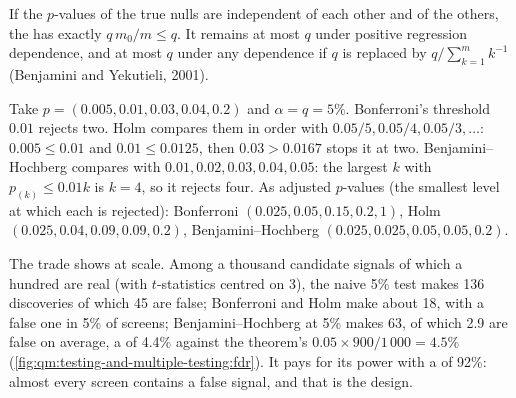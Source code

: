 \begin{theorem}\label{thm:qm:testing-and-multiple-testing:bh}
If the $p$-values of the true nulls are independent of each other and of the others, the  has  exactly $q\,m_0/m \le q$. It remains at most $q$ under positive regression dependence, and at most $q$ under any
dependence if $q$ is replaced by $q/\sum_{k=1}^m k^{-1}$ (Benjamini and Yekutieli, 2001).
\end{theorem}

\begin{example}\label{ex:qm:testing-and-multiple-testing:five}
Take $p = (0.005, 0.01, 0.03, 0.04, 0.2)$ and $\alpha = q = 5\%$. Bonferroni's threshold $0.01$ rejects two. Holm compares them in
order with $0.05/5, 0.05/4, 0.05/3, \dots$: $0.005 \le 0.01$ and $0.01 \le 0.0125$, then $0.03 > 0.0167$ stops it at two. Benjamini--Hochberg
compares with $0.01, 0.02, 0.03, 0.04, 0.05$: the largest $k$ with $p_{(k)} \le 0.01k$ is $k = 4$, so it rejects four. As adjusted
$p$-values (the smallest level at which each is rejected): Bonferroni $(0.025, 0.05, 0.15, 0.2, 1)$, Holm $(0.025, 0.04, 0.09, 0.09, 0.2)$,
Benjamini--Hochberg $(0.025, 0.025, 0.05, 0.05, 0.2)$.
\end{example}

The trade shows at scale. Among a thousand candidate signals of which a hundred are real (with $t$-statistics centred on 3), the
naive 5\% test makes 136 discoveries of which 45 are false; Bonferroni and Holm make about 18, with a false one in 5\% of
screens; Benjamini--Hochberg at 5\% makes 63, of which 2.9 are false on average, a  of 4.4\% against the
theorem's $0.05 \times 900/1\,000 = 4.5\%$ (\cref{fig:qm:testing-and-multiple-testing:fdr}). It pays for its power with a  of 92\%:
almost every screen contains a false signal, and that is the design.

